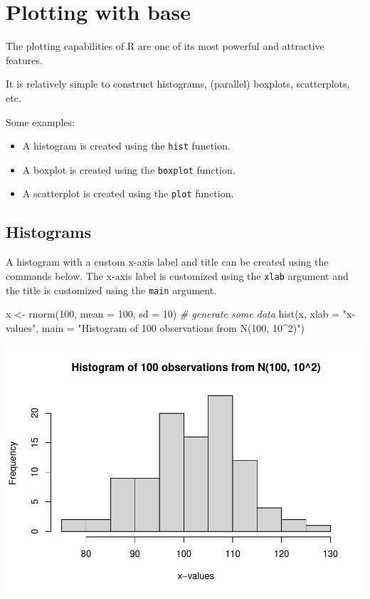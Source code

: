\documentclass[
]{article}
\newenvironment{Shaded}{\begin{snugshade}}{\end{snugshade}}
\newcommand{\AttributeTok}[1]{\textcolor[rgb]{0.77,0.63,0.00}{#1}}
\newcommand{\CommentTok}[1]{\textcolor[rgb]{0.56,0.35,0.01}{\textit{#1}}}
\newcommand{\DecValTok}[1]{\textcolor[rgb]{0.00,0.00,0.81}{#1}}
\newcommand{\FunctionTok}[1]{\textcolor[rgb]{0.00,0.00,0.00}{#1}}
\newcommand{\NormalTok}[1]{#1}
\newcommand{\OtherTok}[1]{\textcolor[rgb]{0.56,0.35,0.01}{#1}}
\newcommand{\StringTok}[1]{\textcolor[rgb]{0.31,0.60,0.02}{#1}}
\providecommand{\tightlist}{%
  \setlength{\itemsep}{0pt}\setlength{\parskip}{0pt}}
\begin{document}
\hypertarget{plotting-with-base}{%
\section{Plotting with base}\label{plotting-with-base}}

The plotting capabilities of R are one of its most powerful and
attractive features.

It is relatively simple to construct histograms, (parallel) boxplots,
scatterplots, etc.

Some examples:

\begin{itemize}
\tightlist
\item
  A histogram is created using the \texttt{hist} function.
\item
  A boxplot is created using the \texttt{boxplot} function.
\item
  A scatterplot is created using the \texttt{plot} function.
\end{itemize}

\hypertarget{histograms}{%
\subsection{Histograms}\label{histograms}}

A histogram with a custom x-axis label and title can be created using
the commands below. The x-axis label is customized using the
\texttt{xlab} argument and the title is customized using the
\texttt{main} argument.

\begin{Shaded}
\begin{Highlighting}[]
\NormalTok{x }\OtherTok{\textless{}{-}} \FunctionTok{rnorm}\NormalTok{(}\DecValTok{100}\NormalTok{, }\AttributeTok{mean =} \DecValTok{100}\NormalTok{, }\AttributeTok{sd =} \DecValTok{10}\NormalTok{) }\CommentTok{\# generate some data}
\FunctionTok{hist}\NormalTok{(x, }\AttributeTok{xlab =} \StringTok{"x{-}values"}\NormalTok{,}
    \AttributeTok{main =} \StringTok{"Histogram of 100 observations from N(100, 10\^{}2)"}\NormalTok{)}
\end{Highlighting}
\end{Shaded}

\includegraphics{crash-course-in-r_files/figure-latex/unnamed-chunk-17-1.pdf}
\end{document}
